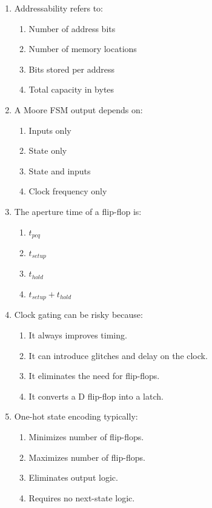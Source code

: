 \documentclass[11pt]{article}
\begin{document}
\begin{enumerate}[label=\textbf{A\arabic*.}]
  \item Addressability refers to:
  \begin{enumerate}[label=(\Alph*)]
    \item Number of address bits
    \item Number of memory locations
    \item Bits stored per address
    \item Total capacity in bytes
  \end{enumerate}

  \item A Moore FSM output depends on:
  \begin{enumerate}[label=(\Alph*)]
    \item Inputs only
    \item State only
    \item State and inputs
    \item Clock frequency only
  \end{enumerate}

  \item The aperture time of a flip-flop is:
  \begin{enumerate}[label=(\Alph*)]
    \item $t_{pcq}$
    \item $t_{setup}$
    \item $t_{hold}$
    \item $t_{setup}+t_{hold}$
  \end{enumerate}

  \item Clock gating can be risky because:
  \begin{enumerate}[label=(\Alph*)]
    \item It always improves timing.
    \item It can introduce glitches and delay on the clock.
    \item It eliminates the need for flip-flops.
    \item It converts a D flip-flop into a latch.
  \end{enumerate}

  \item One-hot state encoding typically:
  \begin{enumerate}[label=(\Alph*)]
    \item Minimizes number of flip-flops.
    \item Maximizes number of flip-flops.
    \item Eliminates output logic.
    \item Requires no next-state logic.
  \end{enumerate}
\end{enumerate}
\end{document}
